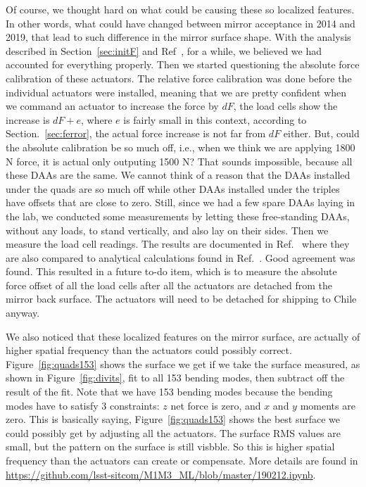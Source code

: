 \documentclass [twoside,openbib,12pt]{article}
\begin{document}
Of course, we thought hard on what could be causing these so
localized features. In other words, what could have changed between
mirror acceptance in 2014 and 2019, that lead to such difference in
the mirror surface shape.
With the analysis described in Section~\ref{sec:initF} and Ref~\cite{m1m3initF},
for a while, we believed we had accounted for everything
properly. Then we started questioning the absolute force calibration
of these actuators. The relative force calibration was done before the
individual actuators were installed, meaning that we are pretty
confident when we command an actuator to increase the force by
$dF$, the load cells show the increase is $dF+e$, where $e$ is fairly
small in this context, according to Section.~\ref{sec:ferror}, the actual
force increase is not far from $dF$ either.
But, could the absolute calibration be so much off, i.e., when we
think we are applying 1800 N force, it is actual only outputing 1500
N?
That sounds impossible, because all these DAAs are the same. We cannot
think of a reason that the DAAs installed under the quads are so much
off while other DAAs installed under the triples have offsets that are
close to zero. Still, since we had a few spare DAAs laying in the lab,
we conducted some measurements by letting these free-standing DAAs,
without any loads, to
stand vertically, and also lay on their sides. Then we measure the
load cell readings. The results are documented in Ref.~\cite{divitFEA}
where they are also compared to analytical calculations found in
Ref.~\cite{m1m3initF}. Good agreement was found.
This resulted in a future to-do item, which is to measure the absolute
force offset of all the load cells after all the actuators are detached from the
mirror back surface. The actuators will need to be detached for shipping to Chile anyway.

We also noticed that these localized features on the mirror surface,
are actually of higher spatial frequency than the actuators could
possibly correct. Figure~\ref{fig:quads153} shows the surface we get
if we take the surface measured, as shown in Figure~\ref{fig:divits},
fit to all 153 bending modes, then subtract off the result of the
fit. Note that we have 153 bending modes because the bending modes
have to satisfy 3 constraints: $z$ net force is zero, and $x$ and $y$
moments are zero. This is basically saying, Figure~\ref{fig:quads153}
shows the best surface we could possibly get by adjusting all the
actuators. The surface RMS values are small, but the pattern on the
surface is still visbble. So this is higher spatial frequency than the
actuators can create or compensate.
More details are found in \url{https://github.com/lsst-sitcom/M1M3_ML/blob/master/190212.ipynb}.
\end{document}
